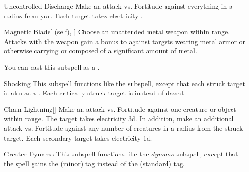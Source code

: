 \begin{ability}[\nth{2}]{Uncontrolled Discharge}
Make an attack vs. Fortitude against everything in a \areamed radius from you.
\hit Each target takes electricity .
\end{ability}
\vspace{0.25em}



\begin{ability}[\nth{3}]{Magnetic Blade}[ (self), ]
Choose an unattended metal weapon within \rngclose range.
Attacks with the weapon gain a  bonus to  against targets wearing metal armor or otherwise carrying or composed of a significant amount of metal.

You can cast this subspell as a .
\end{ability}
\vspace{0.25em}



\begin{ability}[\nth{3}]{Shocking}
This subspell functions like the  subspell, except that each struck target is also  as a .
Each critically struck target is  instead of dazed.
\end{ability}
\vspace{0.25em}



\begin{ability}[\nth{4}]{Chain Lightning}[]
Make an attack vs. Fortitude against one creature or object within \rngmed range.
\hit The target takes electricity  \plus3d.
In addition, make an additional attack vs. Fortitude against any number of creatures in a \areamed radius from the struck target.
\hit Each secondary target takes electricity  \plus1d.
\end{ability}
\vspace{0.25em}



\begin{ability}[\nth{4}]{Greater Dynamo}
This subspell functions like the \textit{dynamo} subspell, except that the spell gains the  (minor) tag instead of the  (standard) tag.
\end{ability}
\vspace{0.25em}


